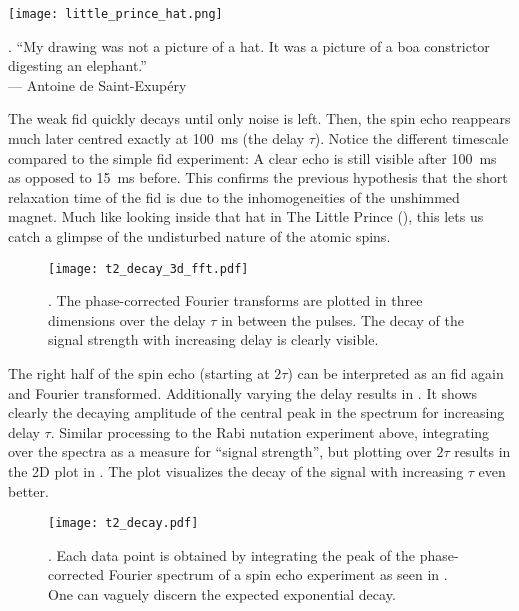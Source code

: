 \begin{marginfigure}
    \centering
    \texttt{[image: little\_prince\_hat.png]}
    \caption{. \enquote{My drawing was not a picture of a hat. It was a picture of a boa constrictor digesting an elephant.}\\
        --- Antoine de Saint-Exupéry}
\end{marginfigure}

The weak \acrshort{fid} quickly decays until only noise is left. Then, the spin echo reappears much later centred exactly at \qty{100}{\milli\second} (the delay \(\tau\)). Notice the different timescale compared to the simple \acrshort{fid} experiment: A clear echo is still visible after \qty{100}{\milli\second} as opposed to \approx{}\qty{15}{\milli\second} before. This confirms the previous hypothesis that the short relaxation time of the \acrshort{fid} is due to the inhomogeneities of the unshimmed magnet. Much like looking inside that hat in The Little Prince (), this lets us catch a glimpse of the undisturbed nature of the atomic spins.

\begin{figure}[h!bt]
    \centering
    \texttt{[image: t2\_decay\_3d\_fft.pdf]}
    \caption{. The phase-corrected Fourier transforms are plotted in three dimensions over the delay \(\tau\) in between the pulses. The decay of the signal strength with increasing delay is clearly visible.}
\end{figure}

The right half of the spin echo (starting at \(2\tau\)) can be interpreted as an \acrshort{fid} again and Fourier transformed. Additionally varying the delay results in . It shows clearly the decaying amplitude of the central peak in the spectrum for increasing delay \(\tau\). Similar processing to the Rabi nutation experiment above, integrating over the spectra as a measure for \enquote{signal strength}, but plotting over \(2\tau\) results in the 2D plot in . The plot visualizes the decay of the signal with increasing \(\tau\) even better.

\begin{figure}[h!bt]
    \centering
    \texttt{[image: t2\_decay.pdf]}
    \caption{. Each data point is obtained by integrating the peak of the phase-corrected Fourier spectrum of a spin echo experiment as seen in . One can vaguely discern the expected exponential decay.}
\end{figure}

